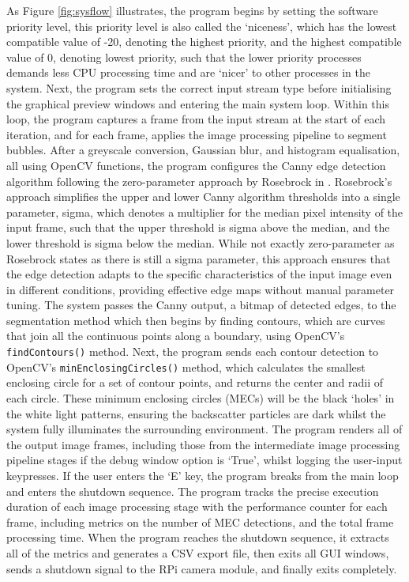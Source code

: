 As Figure \ref{fig:sysflow} illustrates, the program begins by setting the software priority level, this priority level is also called the `niceness', which has the lowest compatible value of -20, denoting the highest priority, and the highest compatible value of 0, denoting lowest priority, such that the lower priority processes demands less CPU processing time and are `nicer' to other processes in the system. Next, the program sets the correct input stream type before initialising the graphical preview windows and entering the main system loop. Within this loop, the program captures a frame from the input stream at the start of each iteration, and for each frame, applies the image processing pipeline to segment bubbles. After a greyscale conversion, Gaussian blur, and histogram equalisation, all using OpenCV functions, the program configures the Canny edge detection algorithm following the zero-parameter approach by Rosebrock in \cite{rosebrockZeroparameterAutomaticCanny2015}. Rosebrock's approach simplifies the upper and lower Canny algorithm thresholds into a single parameter, sigma, which denotes a multiplier for the median pixel intensity of the input frame, such that the upper threshold is sigma above the median, and the lower threshold is sigma below the median. While not exactly zero-parameter as Rosebrock states as there is still a sigma parameter, this approach ensures that the edge detection adapts to the specific characteristics of the input image even in different conditions, providing effective edge maps without manual parameter tuning. The system passes the Canny output, a bitmap of detected edges, to the segmentation method which then begins by finding contours, which are curves that join all the continuous points along a boundary, using OpenCV's \texttt{findContours()} method. Next, the program sends each contour detection to OpenCV's \texttt{minEnclosingCircles()} method, which calculates the smallest enclosing circle for a set of contour points, and returns the center and radii of each circle. These minimum enclosing circles (MECs) will be the black `holes' in the white light patterns, ensuring the backscatter particles are dark whilst the system fully illuminates the surrounding environment. The program renders all of the output image frames, including those from the intermediate image processing pipeline stages if the debug window option is `True', whilst logging the user-input keypresses. If the user enters the `E' key, the program breaks from the main loop and enters the shutdown sequence. The program tracks the precise execution duration of each image processing stage with the performance counter for each frame, including metrics on the number of MEC detections, and the total frame processing time. When the program reaches the shutdown sequence, it extracts all of the metrics and generates a CSV export file, then exits all GUI windows, sends a shutdown signal to the RPi camera module, and finally exits completely.

